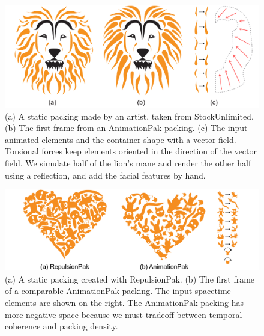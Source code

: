 \begin{figure}
  \centering
  \includegraphics[width=1.0\textwidth]{figures/animationpak/lion_comparison.pdf}
  \caption[A packing of lion's mane]
  {
  \label{fig_animationpak_lion}
    (a) A static packing made by an artist, taken from StockUnlimited. 
  (b) The first frame from an AnimationPak packing. 
  (c) The input animated elements and the container shape with a vector field.
  Torsional forces keep elements oriented in the direction of the
  vector field.  We simulate half of the lion's mane and render the other
  half using a reflection, and add the facial features by hand.
  }  
\end{figure}
\begin{figure}
  \centering
  \includegraphics[width=1.0\textwidth]{figures/animationpak/repulsionpak_vs_animationpak.pdf}
  \caption[A comparison between RepulsionPak and AnimationPak]
  {
  \label{fig_animationpak_repulsionpak_vs_animationpak}
    (a) A static packing created with RepulsionPak.
  (b) The first frame of a comparable AnimationPak packing.
    The input spacetime elements are shown on the right.
  The AnimationPak packing has more negative space because
  we must tradeoff between temporal coherence and packing density.
  }  
\end{figure}

